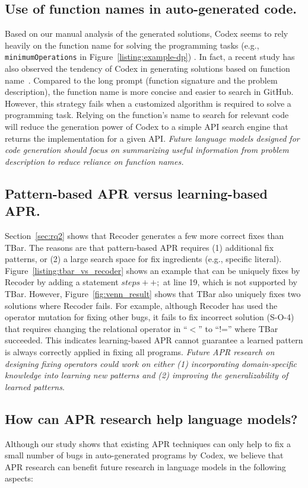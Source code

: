 \subsection{Use of function names in auto-generated code.} Based on our manual analysis of the generated solutions, Codex seems to rely heavily on the function name for solving the programming tasks (e.g., \texttt{minimumOperations} in Figure~\ref{listing:example-dp}) . In fact, a recent study has also observed the tendency of Codex in generating solutions based on function name~\cite{jones2022capturing}. Compared to the long prompt (function signature and the problem description), the function name is more concise and easier to search in GitHub. However, this strategy fails when a customized algorithm is required to solve a programming task. Relying on the function's name to search for relevant code will reduce the generation power of Codex to a simple API search engine that returns the implementation for a given API.   \emph{Future language models designed for code generation should focus on summarizing useful information from problem description to reduce reliance on function names.}

\subsection{Pattern-based APR versus learning-based APR.}

Section~\ref{sec:rq2} shows that Recoder generates a few more correct fixes than TBar. The reasons are that pattern-based APR requires (1) additional fix patterns, or (2) a large search space for fix ingredients (e.g., specific literal). Figure~\ref{listing:tbar_vs_recoder} shows an example that can be uniquely fixes by Recoder by adding a statement $\mathit{steps}++;$ at line 19, which is not supported by TBar. However, Figure~\ref{fig:venn_result} shows that TBar also uniquely fixes two solutions where Recoder fails. For example, although Recoder has used the operator mutation for fixing other bugs, it fails to fix incorrect solution (S-O-4) that requires changing the relational operator in ``$\mathit{<}$'' to ``!='' where TBar succeeded. This indicates learning-based APR cannot guarantee a learned pattern is always correctly applied in fixing all programs. \emph{Future APR research on designing fixing operators could work on either (1) incorporating domain-specific knowledge into learning new patterns and (2) improving the generalizability of learned patterns}.

\subsection{How can APR research help language models?} Although our study shows that existing APR techniques can only help to fix a small number of bugs in auto-generated programs by Codex, we believe that APR research can benefit future research in language models in the following aspects:

